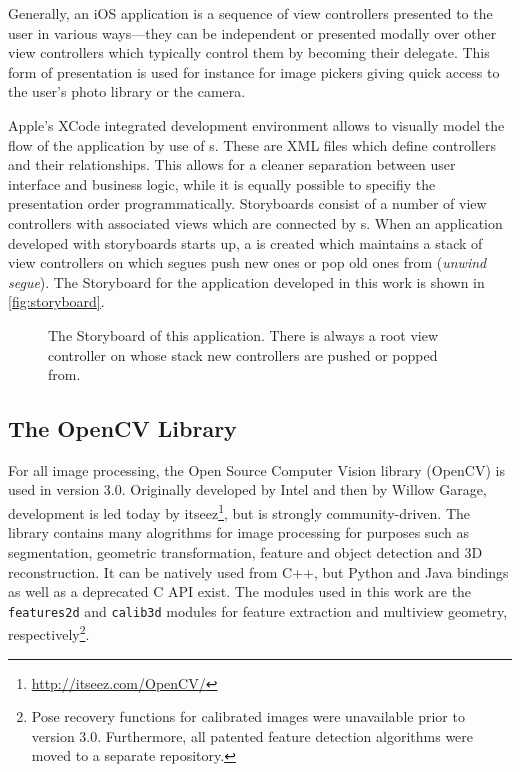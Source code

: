 Generally, an iOS application is a sequence of view controllers presented to the
user in various ways---they can be independent or presented modally over other
view controllers which typically control them by becoming their delegate. This
form of presentation is used for instance for image pickers giving quick access
to the user's photo library or the camera.

Apple's XCode integrated development environment allows to visually model the
flow of the application by use of s. These are XML files which
define controllers and their relationships.  This allows for a cleaner
separation between user interface and business logic, while it is equally
possible to specifiy the presentation order programmatically.  Storyboards
consist of a number of view controllers with associated views which are
connected by s. When an application developed with storyboards
starts up, a  is created which maintains a stack of
view controllers on which segues push new ones or pop old ones from (\emph{unwind
segue}).  The Storyboard for the application developed in this work is shown in
\autoref{fig:storyboard}.

\begin{figure}[h]
   {\centering      
      
      \caption[Storyboard example]{The Storyboard of this application. There is
      always a root view controller on whose stack new controllers are pushed or popped from.}
   \label{fig:storyboard}}
\end{figure}

\FloatBarrier

\subsection{The OpenCV Library}

For all image processing, the Open Source Computer Vision library (OpenCV) is
used in version 3.0. Originally developed by Intel and then by Willow Garage,
development is led today by itseez\footnote{\url{http://itseez.com/OpenCV/}},
but is strongly community-driven. The library contains many alogrithms for image
processing for purposes such as segmentation, geometric transformation, feature
and object detection and 3D reconstruction. It can be natively used from C++,
but Python and Java bindings as well as a deprecated C API exist.
The modules used in this work are the \texttt{features2d} and \texttt{calib3d}
modules for feature extraction and multiview geometry,
respectively\footnote{Pose recovery functions for calibrated images were
unavailable prior to version 3.0. Furthermore, all patented feature detection
algorithms were moved to a separate repository.}.

